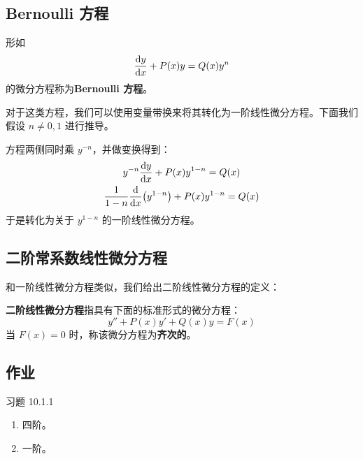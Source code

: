\subsection{Bernoulli 方程}

\begin{definition}
    形如
    $$
    \dv{y}{x} + P(x) y = Q(x) y^{n}
    $$
    的微分方程称为\textbf{Bernoulli 方程}。
\end{definition}

对于这类方程，我们可以使用变量带换来将其转化为一阶线性微分方程。下面我们假设 $n \neq 0, 1$ 进行推导。

方程两侧同时乘 $y^{-n}$，并做变换得到：
$$
\begin{gathered}
    y^{-n} \dv{y}{x} + P(x) y^{1 - n} = Q(x) \\
    \frac{1}{1 - n} \dv{x}(y^{1 - n}) + P(x) y^{1 - n} = Q(x)
\end{gathered}
$$
于是转化为关于 $y^{1 - n}$ 的一阶线性微分方程。

\subsection{二阶常系数线性微分方程}

和一阶线性微分方程类似，我们给出二阶线性微分方程的定义：

\begin{definition}
    \textbf{二阶线性微分方程}指具有下面的标准形式的微分方程：
    $$
    y'' + P(x) y' + Q(x) y = F(x)
    $$
    当 $F(x) = 0$ 时，称该微分方程为\textbf{齐次的}。
\end{definition}

\subsection{作业}

\begin{problem}
    习题 10.1.1
    \begin{solution}
        \begin{enumerate}
            \item[\textbf{1)}] 四阶。
            \item[\textbf{2)}] 一阶。 
        \end{enumerate}
    \end{solution}
\end{problem}

